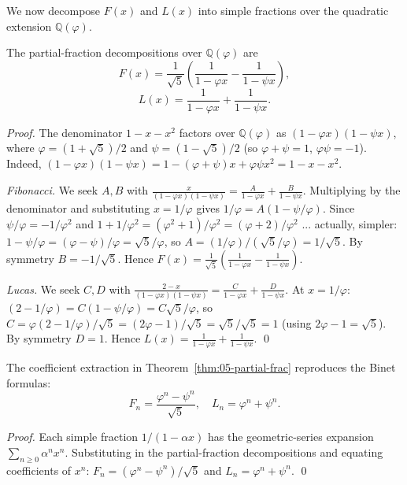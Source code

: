 We now decompose $F(x)$ and $L(x)$ into simple fractions over the
quadratic extension $\mathbb{Q}(\varphi)$.

\begin{theorem}
\label{thm:05-partial-frac}
The partial-fraction decompositions over $\mathbb{Q}(\varphi)$ are
\[
  F(x) = \frac{1}{\sqrt{5}} \left( \frac{1}{1 - \varphi x} - \frac{1}{1 - \psi x} \right),
\]
\[
  L(x) = \frac{1}{1 - \varphi x} + \frac{1}{1 - \psi x}.
\]
\end{theorem}

\begin{proof}
The denominator $1 - x - x^2$ factors over $\mathbb{Q}(\varphi)$ as
$(1 - \varphi x)(1 - \psi x)$, where $\varphi = (1+\sqrt{5})/2$ and
$\psi = (1-\sqrt{5})/2$ (so $\varphi + \psi = 1$, $\varphi \psi = -1$).
Indeed, $(1 - \varphi x)(1 - \psi x) = 1 - (\varphi + \psi) x +
\varphi \psi x^2 = 1 - x - x^2$.

\emph{Fibonacci.} We seek $A, B$ with
$\frac{x}{(1-\varphi x)(1-\psi x)} = \frac{A}{1-\varphi x} + \frac{B}{1-\psi x}$.
Multiplying by the denominator and substituting $x = 1/\varphi$ gives
$1/\varphi = A (1 - \psi/\varphi)$. Since $\psi/\varphi = -1/\varphi^2$
and $1 + 1/\varphi^2 = (\varphi^2 + 1)/\varphi^2 = (\varphi + 2)/\varphi^2$
... actually, simpler: $1 - \psi/\varphi = (\varphi - \psi)/\varphi = \sqrt{5}/\varphi$,
so $A = (1/\varphi)/(\sqrt{5}/\varphi) = 1/\sqrt{5}$. By symmetry
$B = -1/\sqrt{5}$. Hence
$F(x) = \frac{1}{\sqrt{5}} \left(\frac{1}{1 - \varphi x} - \frac{1}{1 - \psi x}\right)$.

\emph{Lucas.} We seek $C, D$ with
$\frac{2 - x}{(1-\varphi x)(1-\psi x)} = \frac{C}{1-\varphi x} + \frac{D}{1-\psi x}$.
At $x = 1/\varphi$: $(2 - 1/\varphi) = C(1 - \psi/\varphi) = C \sqrt{5}/\varphi$,
so $C = \varphi (2 - 1/\varphi)/\sqrt{5} = (2\varphi - 1)/\sqrt{5} = \sqrt{5}/\sqrt{5} = 1$
(using $2\varphi - 1 = \sqrt{5}$). By symmetry $D = 1$. Hence
$L(x) = \frac{1}{1 - \varphi x} + \frac{1}{1 - \psi x}$. \qed
\end{proof}

\begin{corollary}
\label{cor:05-binet}
The coefficient extraction in Theorem~\ref{thm:05-partial-frac}
reproduces the Binet formulas:
\[
  F_n = \frac{\varphi^n - \psi^n}{\sqrt{5}}, \quad L_n = \varphi^n + \psi^n.
\]
\end{corollary}

\begin{proof}
Each simple fraction $1/(1 - \alpha x)$ has the geometric-series
expansion $\sum_{n \ge 0} \alpha^n x^n$. Substituting in the
partial-fraction decompositions and equating coefficients of $x^n$:
$F_n = (\varphi^n - \psi^n)/\sqrt{5}$ and $L_n = \varphi^n + \psi^n$. \qed
\end{proof}

